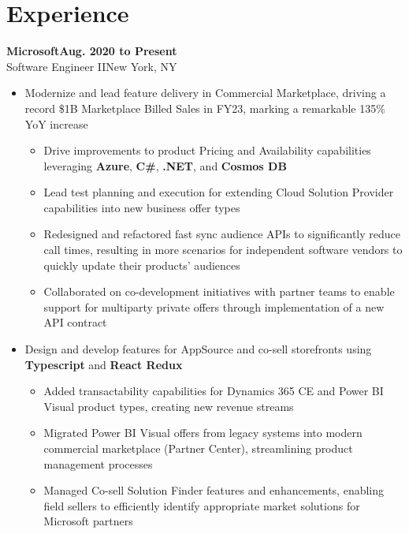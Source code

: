 \documentclass[9pt]{extarticle}
\newcommand{\experiencesubsection}[4]{
    \vspace{0.75em}\Large\textbf{#1\hfill{#4}}\\{#2}\hfill{#3}\normalsize
}
\begin{document}
\hfill\begin{minipage}[t]{.7\textwidth}  %
    \section{Experience}
    \experiencesubsection{Microsoft}{Software Engineer II}{New York, NY}{Aug. 2020 to Present}
    \begin{itemize}
        \setlength\itemsep{1dd}
        \item Modernize and lead feature delivery in Commercial Marketplace, driving a record \$1B Marketplace Billed Sales in FY23, marking a remarkable 135\% YoY increase
            \begin{itemize}[topsep=0pt]
                \setlength\itemsep{1dd}
                \item Drive improvements to product Pricing and Availability capabilities leveraging \textbf{Azure}, \textbf{C\#}, \textbf{.NET}, and \textbf{Cosmos DB}
                \item Lead test planning and execution for extending Cloud Solution Provider capabilities into new business offer types
                \item Redesigned and refactored fast sync audience APIs to significantly reduce call times, resulting in more scenarios for independent
                    software vendors to quickly update their products' audiences
                \item Collaborated on co-development initiatives with partner teams to enable support for multiparty private offers through implementation of a new API contract
            \end{itemize}
        \item Design and develop features for AppSource and co-sell storefronts using \textbf{Typescript} and \textbf{React Redux}
            \begin{itemize}[topsep=0pt]
                \setlength\itemsep{1dd}
                \item Added transactability capabilities for Dynamics 365 CE and Power BI Visual product types, creating new revenue streams
                \item Migrated Power BI Visual offers from legacy systems into modern commercial marketplace (Partner Center), streamlining product management processes
                \item Managed Co-sell Solution Finder features and enhancements, enabling field sellers to efficiently identify appropriate market solutions for Microsoft partners

\end{itemize}
\end{itemize}
\end{minipage}
\end{document}
